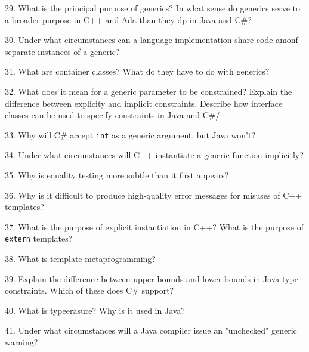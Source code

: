 29. What is the principal purpose of generics? In what sense do generics serve to a broader purpose in C++ and Ada than they dp in Java and C$\#$?

\filbreak
\vskip 1cm

30. Under what circumstances can a language implementation share code amonf separate instances of a generic?

\filbreak
\vskip 1cm

31. What are container classes? What do they have to do with generics?

\filbreak
\vskip 1cm

32. What does it mean for a generic parameter to be constrained? Explain the difference between explicity and implicit constraints. Describe how interface classes can be used to specify constraints in Java and C$\#$/

\filbreak
\vskip 1cm

33. Why will C$\#$ accept {\tt int} as a generic argument, but Java won't?

\filbreak
\vskip 1cm

34. Under what circumstances will C++ instantiate a generic function implicitly?

\filbreak
\vskip 1cm

35. Why is equality testing more subtle than it first appears?

\filbreak
\vskip 1cm

36. Why is it difficult to produce high-quality error messages for misuses of C++ templates?

\filbreak
\vskip 1cm

37. What is the purpose of explicit instantiation in C++? What is the purpose of {\tt extern} templates?

\filbreak
\vskip 1cm

38. What is template metaprogramming?

\filbreak
\vskip 1cm

39. Explain the difference between upper bounds and lower bounds in Java type constraints. Which of these does C$\#$ support?

\filbreak
\vskip 1cm

40. What is typeerasure? Why is it used in Java?

\filbreak
\vskip 1cm

41. Under what circumstances will a Java compiler issue an "unchecked" generic warning?

\filbreak
\vskip 1cm


